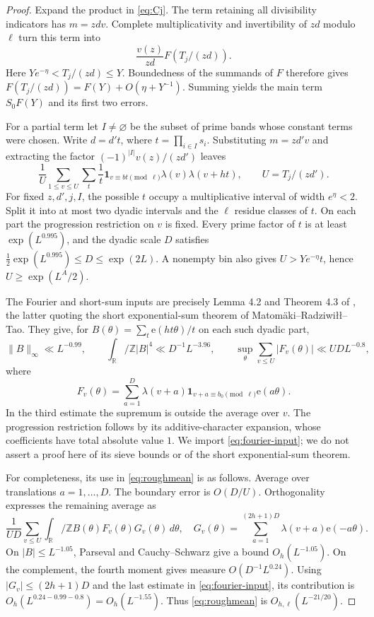 \documentclass[11pt,a4paper]{article}
\numberwithin{equation}{section}
\theoremstyle{remark}\newtheorem{remark}[theorem]{Remark}
\newcommand{\T}{\mathbb R/\mathbb Z}
\newcommand{\1}{\mathbf 1}
\newcommand{\ee}{\mathrm e}
\begin{document}
\begin{proof}
Expand the product in \eqref{eq:Cj}. The term retaining all divisibility
indicators has $m=zdv$. Complete multiplicativity and invertibility of
$zd$ modulo $\ell$ turn this term into
\[
 \frac{v(z)}{zd}F(T_j/(zd)).
\]
Here $Ye^{-\eta}<T_j/(zd)\le Y$. Boundedness of the summands of $F$
therefore gives $F(T_j/(zd))=F(Y)+O(\eta+Y^{-1})$.
Summing yields the main term $S_0F(Y)$ and its first two errors.

For a partial term let $I\ne\varnothing$ be the subset of prime bands
whose constant terms were chosen. Write $d=d't$, where
$t=\prod_{i\in I}s_i$. Substituting $m=zd'v$ and extracting the
factor $(-1)^{|I|}v(z)/(zd')$ leaves
\begin{equation}\label{eq:roughmean}
 \frac1U\sum_{1\le v\le U}\sum_t\frac1t
   \1_{v\equiv bt\pmod\ell}\lambda(v)\lambda(v+ht),
 \qquad U=T_j/(zd').
\end{equation}
For fixed $z,d',j,I$, the possible $t$ occupy a multiplicative interval
of width $e^{\eta}<2$. Split it into at most two dyadic intervals and
the $\ell$ residue classes of $t$. On each part the progression
restriction on $v$ is fixed. Every prime factor of $t$ is at least
$\exp(L^{0.995})$, and the dyadic scale $D$ satisfies
$\tfrac12\exp(L^{0.995})\le D\le\exp(2L)$. A nonempty bin also gives
$U>Ye^{-\eta}t$, hence $U\ge\exp(L^A/2)$.

The Fourier and short-sum inputs are precisely Lemma 4.2 and Theorem
4.3 of \cite{final}, the latter quoting the short exponential-sum
theorem of Matom\"aki--Radziwi\l\l--Tao. They give, for
$B(\theta)=\sum_t\ee(ht\theta)/t$ on each such dyadic part,
\begin{equation}\label{eq:fourier-input}
 \|B\|_\infty\ll L^{-0.99},\qquad
 \int_\T|B|^4\ll D^{-1}L^{-3.96},\qquad
 \sup_\theta\sum_{v\le U}|F_v(\theta)|\ll UD L^{-0.8},
\end{equation}
where
\[
 F_v(\theta)=\sum_{a=1}^D\lambda(v+a)
             \1_{v+a\equiv b_0\pmod\ell}\ee(a\theta).
\]
In the third estimate the supremum is outside the average over $v$.
The progression restriction follows by its additive-character
expansion, whose coefficients have total absolute value $1$.
We import \eqref{eq:fourier-input}; we do not assert a proof here of
its sieve bounds or of the short exponential-sum theorem.

For completeness, its use in \eqref{eq:roughmean} is as follows.
Average over translations $a=1,\ldots,D$. The boundary error is
$O(D/U)$. Orthogonality expresses the remaining average as
\[
 \frac1{UD}\sum_{v\le U}\int_\T
 B(\theta)F_v(\theta)G_v(\theta)\,d\theta,
 \quad G_v(\theta)=\sum_{a=1}^{(2h+1)D}\lambda(v+a)\ee(-a\theta).
\]
On $|B|\le L^{-1.05}$, Parseval and Cauchy--Schwarz give a bound
$O_h(L^{-1.05})$. On the complement, the fourth moment gives measure
$O(D^{-1}L^{0.24})$. Using $|G_v|\le(2h+1)D$ and the last estimate in
\eqref{eq:fourier-input}, its contribution is
$O_h(L^{0.24-0.99-0.8})=O_h(L^{-1.55})$. Thus \eqref{eq:roughmean}
is $O_{h,\ell}(L^{-21/20})$.


\end{proof}
\end{document}
